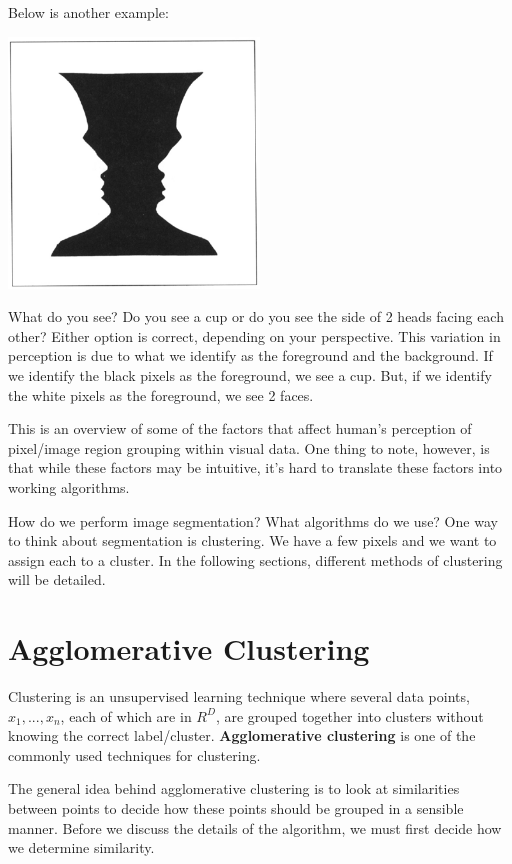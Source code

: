 \documentclass{article}
\begin{document}
Below is another example:
\begin{center}
\includegraphics[width=0.5\textwidth]{figure-ground.png}
\end{center}

What do you see? Do you see a cup or do you see the side of 2 heads facing each other? Either option is correct, depending on your perspective. This variation in perception is due to what we identify as the foreground and the background. If we identify the black pixels as the foreground, we see a cup. But, if we identify the white pixels as the foreground, we see 2 faces.

This is an overview of some of the factors that affect human's perception of pixel/image region grouping within visual data. One thing to note, however, is that while these factors may be intuitive, it's hard to translate these factors into working algorithms.

How do we perform image segmentation? What algorithms do we use? One way to think about segmentation is clustering. We have a few pixels and we want to assign each to a cluster. In the following sections, different methods of clustering will be detailed.

\section{Agglomerative Clustering}

Clustering is an unsupervised learning technique where several data points, $x_1, ..., x_n$, each of which are in $R^D$, are grouped together into clusters without knowing the correct label/cluster. \textbf{Agglomerative clustering} is one of the commonly used techniques for clustering.

The general idea behind agglomerative clustering is to look at similarities between points to decide how these points should be grouped in a sensible manner. Before we discuss the details of the algorithm, we must first decide how we determine similarity.
\end{document}
